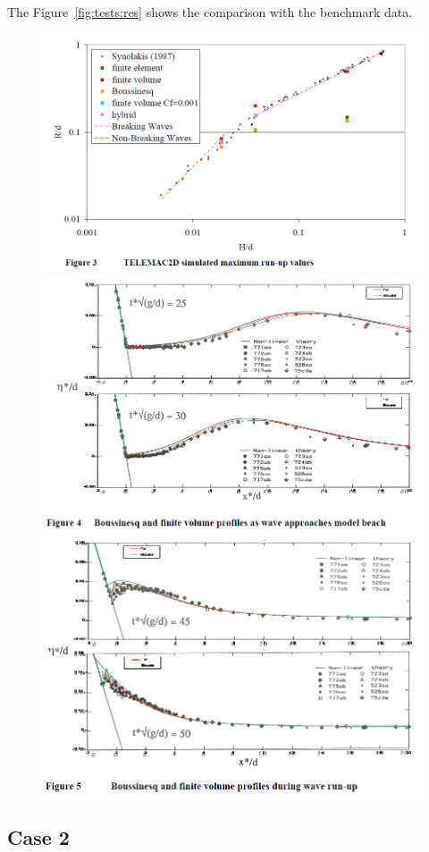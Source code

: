 The Figure~\ref{fig:tests:res} shows the comparison with the benchmark data.
\begin{figure}
\centering
\includegraphics[width=.8\textwidth]{img/fig3.png}
\includegraphics[width=.8\textwidth]{img/fig4.png}
\includegraphics[width=.8\textwidth]{img/fig5.png}
\end{figure}

\subsection{Case 2}


